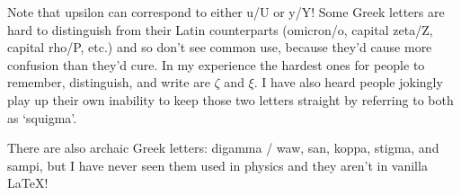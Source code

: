 	Note that upsilon can correspond to either u/U or y/Y!
	Some Greek letters are hard to distinguish from their Latin counterparts (omicron/o, capital zeta/Z, capital rho/P, etc.) and so don't see common use, because they'd cause more confusion than they'd cure.
	In my experience the hardest ones for people to remember, distinguish, and write are $\zeta$ and $\xi$.
	I have also heard people jokingly play up their own inability to keep those two letters straight by referring to both as `squigma'.

	There are also archaic Greek letters: digamma / waw, san, koppa, stigma, and sampi, but I have never seen them used in physics and they aren't in vanilla \LaTeX!





